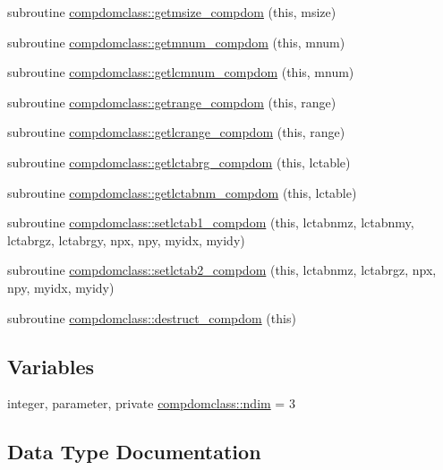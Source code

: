 \begin{DoxyCompactItemize}
\item 
subroutine \mbox{\hyperlink{namespacecompdomclass_a460a22916802ee9041aa66d1922cb812}{compdomclass\+::getmsize\+\_\+compdom}} (this, msize)
\item 
subroutine \mbox{\hyperlink{namespacecompdomclass_a4742fe5698151e1e31e2261798a433c8}{compdomclass\+::getmnum\+\_\+compdom}} (this, mnum)
\item 
subroutine \mbox{\hyperlink{namespacecompdomclass_a545b0a4e8dce9ec9c326806ed1b36598}{compdomclass\+::getlcmnum\+\_\+compdom}} (this, mnum)
\item 
subroutine \mbox{\hyperlink{namespacecompdomclass_acba710aa1017492e05a537273742cc16}{compdomclass\+::getrange\+\_\+compdom}} (this, range)
\item 
subroutine \mbox{\hyperlink{namespacecompdomclass_ad0a907860c5bf17c263d8ad957c7ed1d}{compdomclass\+::getlcrange\+\_\+compdom}} (this, range)
\item 
subroutine \mbox{\hyperlink{namespacecompdomclass_ab679e7ac8218e1580f1a45a53d1fe9f1}{compdomclass\+::getlctabrg\+\_\+compdom}} (this, lctable)
\item 
subroutine \mbox{\hyperlink{namespacecompdomclass_a7c7c1450a459bb1753ef8230ab0d7651}{compdomclass\+::getlctabnm\+\_\+compdom}} (this, lctable)
\item 
subroutine \mbox{\hyperlink{namespacecompdomclass_a60f5ad087b624e541fe9c0872e1c4b90}{compdomclass\+::setlctab1\+\_\+compdom}} (this, lctabnmz, lctabnmy, lctabrgz, lctabrgy, npx, npy, myidx, myidy)
\item 
subroutine \mbox{\hyperlink{namespacecompdomclass_a4bc32865e40fe6b277898a429caff3ca}{compdomclass\+::setlctab2\+\_\+compdom}} (this, lctabnmz, lctabrgz, npx, npy, myidx, myidy)
\item 
subroutine \mbox{\hyperlink{namespacecompdomclass_ae220a1544909bd8851faed61ce9ad7b8}{compdomclass\+::destruct\+\_\+compdom}} (this)
\end{DoxyCompactItemize}
\subsection*{Variables}
\begin{DoxyCompactItemize}
\item 
integer, parameter, private \mbox{\hyperlink{namespacecompdomclass_a01f031d8af670f66db4484cd6411e99f}{compdomclass\+::ndim}} = 3
\end{DoxyCompactItemize}


\subsection{Data Type Documentation}
\label{structcompdomclass_1_1compdom}
